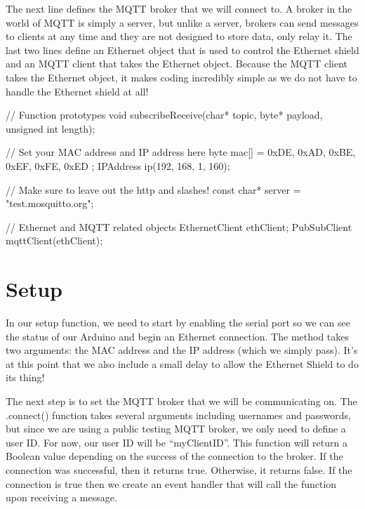 The next line defines the MQTT broker that we will connect to. A broker in the world of MQTT is simply a server, but unlike a server, brokers can send messages to clients at any time and they are not designed to store data, only relay it. The last two lines define an Ethernet object that is used to control the Ethernet shield and an MQTT client that takes the Ethernet object. Because the MQTT client takes the Ethernet object, it makes coding incredibly simple as we do not have to handle the Ethernet shield at all!

\begin{Arduino}
// Function prototypes
void subscribeReceive(char* topic, byte* payload, unsigned int length);
	
// Set your MAC address and IP address here
byte mac[] = { 0xDE, 0xAD, 0xBE, 0xEF, 0xFE, 0xED };
IPAddress ip(192, 168, 1, 160);
	
// Make sure to leave out the http and slashes!
const char* server = "test.mosquitto.org";
	
// Ethernet and MQTT related objects
EthernetClient ethClient;
PubSubClient mqttClient(ethClient);
\end{Arduino}

\section{Setup}


In our setup function, we need to start by enabling the serial port so we can see the status of our Arduino and begin an Ethernet connection. The method  takes two arguments: the MAC address and the IP address (which we simply pass). It's at this point that we also include a small delay to allow the Ethernet Shield to do its thing!

The next step is to set the MQTT broker that we will be communicating on. The .connect() function takes several arguments including usernames and passwords, but since we are using a public testing MQTT broker, we only need to define a user ID. For now, our user ID will be “myClientID”. This function will return a Boolean value depending on the success of the connection to the broker. If the connection was successful, then it returns true. Otherwise, it returns false. If the connection is true then we create an event handler that will call the function  upon receiving a message.

\bigskip

